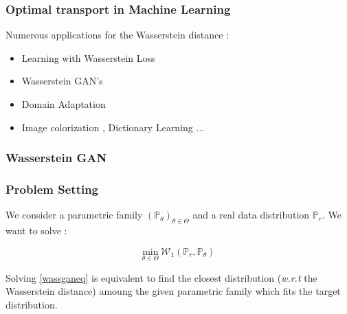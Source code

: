 \documentclass[french,9pt]{beamer}
\begin{document}
\begin{frame}
  \frametitle{Optimal transport in Machine Learning}
  
Numerous applications for the Wasserstein distance :

 \begin{itemize}
 \item Learning with Wasserstein Loss \cite{2015arXiv150605439F} 
 \item Wasserstein GAN's \cite{arjovsky_wgan_2017}
\item Domain Adaptation \cite{courty2017optimal}
\item Image colorization \cite{ferradans2014regularized}, Dictionary Learning \cite{pmlr-v51-rolet16} ... 
 \end{itemize}


\end{frame}



\subsubsection{Wasserstein GAN}

\begin{frame}
\frametitle{Problem Setting \cite{arjovsky_wgan_2017}}
We consider a parametric family $(\mathbb{P}_{\theta})_{\theta \in \Theta}$ and a real data distribution $\mathbb{P}_{r}$. We want to solve :

\begin{equation}
\label{wassganeq}
\underset{\theta \in \Theta}{\text{min}} \  \mathcal{W}_{1}(\mathbb{P}_{r},\mathbb{P}_{\theta})
\end{equation}

Solving \eqref{wassganeq} is equivalent to find the closest distribution (\textit{w.r.t} the Wasserstein distance) amoung the given parametric family which fits the target distribution.

\end{frame}

\end{document}
